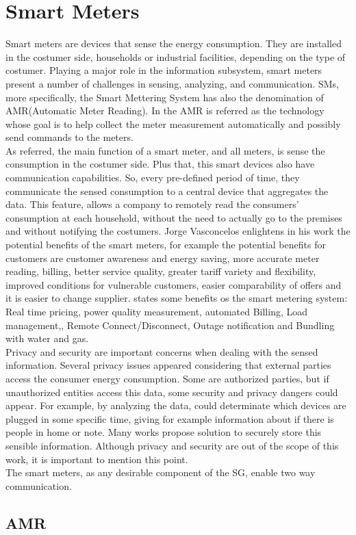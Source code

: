 
\section{Smart Meters}
Smart meters are devices that sense the energy consumption. They are installed in the costumer side,  households or industrial facilities, depending on the type of costumer. Playing a major role in the information subsystem, smart meters present a number of challenges in sensing, analyzing, and communication\cite{journals/spm/ErkinTLP13}. SMs, more specifically, the Smart Mettering System has also the denomination of AMR(Automatic Meter Reading). In \cite{khalifa2011survey} the AMR is referred as the technology whose goal is to help collect the meter measurement automatically and possibly send commands to the meters.\\
As referred, the main function of a smart meter, and all meters, is sense the consumption in the costumer side. Plus that, this smart devices also have communication capabilities. So, every pre-defined period of time, they communicate the sensed consumption to a central device that aggregates the data. This feature, allows a company to remotely read the consumers' consumption at each household, without the need to actually go to the premises and without notifying the costumers\cite{Ericsson_2}. Jorge Vasconcelos \cite{RePEc:erp:euirsc:p0193} enlightens in his work the potential benefits of the smart meters, for  example the potential benefits for customers are customer awareness and energy saving, more accurate meter reading, billing, better service quality, greater tariff variety and flexibility, improved conditions for vulnerable customers, easier comparability of offers and it is easier to change supplier. \cite{khalifa2011survey} states some benefits os the smart metering system: Real time pricing, power quality measurement, automated Billing, Load management,, Remote Connect/Disconnect, Outage notification and Bundling with water and gas.\\
Privacy and security are important concerns when dealing with the sensed information. Several privacy issues appeared considering that external parties access the consumer energy consumption. Some are authorized parties, but if unauthorized entities access this data, some security and privacy dangers could appear. For example, by analyzing the data, could determinate which devices are plugged in some specific time, giving for example information about if there is people in home or note. Many works propose solution to securely store this sensible information. Although privacy and security are out of the scope of this work, it is important to mention this point.\\
The smart meters, as any desirable component of the SG, enable two way communication.
\subsection{AMR}


